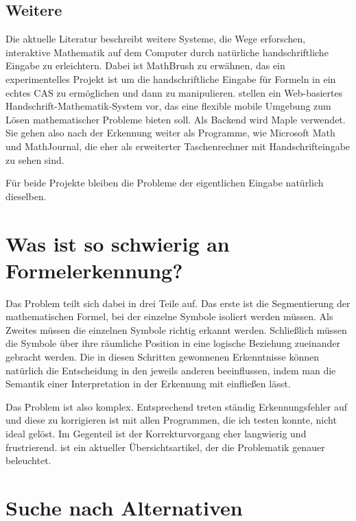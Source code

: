 \subsection{Weitere}
\label{sub:mathbrush}

Die aktuelle Literatur beschreibt weitere Systeme, die Wege erforschen, interaktive Mathematik auf dem Computer durch natürliche handschriftliche Eingabe zu erleichtern. Dabei ist MathBrush \cite{Labahn:2008p10301} zu erwähnen, das ein experimentelles Projekt ist um die handschriftliche Eingabe für Formeln in ein echtes \ac{CAS} zu ermöglichen und dann zu manipulieren. \citet{Vuong:2010p10279} stellen ein Web-basiertes Handschrift-Mathematik-System vor, das eine flexible mobile Umgebung zum Lösen mathematischer Probleme bieten soll. Als Backend wird Maple \cite{maple} verwendet. Sie gehen also nach der Erkennung weiter als Programme, wie Microsoft Math und MathJournal, die eher als erweiterter Taschenrechner mit Handschrifteingabe zu sehen sind.

Für beide Projekte bleiben die Probleme der eigentlichen Eingabe natürlich dieselben.

\section{Was ist so schwierig an Formelerkennung?}

Das Problem teilt sich dabei in drei Teile auf. Das erste ist die Segmentierung der mathematischen Formel, bei der einzelne Symbole isoliert werden müssen. Als Zweites müssen die einzelnen Symbole richtig erkannt werden. Schließlich müssen die Symbole über ihre räumliche Position in eine logische Beziehung zueinander gebracht werden. Die in diesen Schritten gewonnenen Erkenntnisse können natürlich die Entscheidung in den jeweils anderen beeinflussen, indem man die Semantik einer Interpretation in der Erkennung mit einfließen lässt.

Das Problem ist also komplex. Entsprechend treten ständig Erkennungsfehler auf und diese zu korrigieren ist mit allen Programmen, die ich testen konnte, nicht ideal gelöst. Im Gegenteil ist der Korrekturvorgang eher langwierig und frustrierend. \cite{Tapia:2007p9160} ist ein aktueller Übersichtsartikel, der die Problematik genauer beleuchtet.

\section{Suche nach Alternativen}
\label{sec:alternativen}


